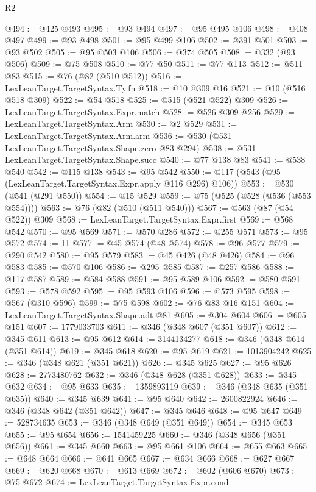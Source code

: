 \begin{lexlean}{R2}
\begin{coremodule}
@494 := @425 @493
@495 := @93 @494
@497 := @95 @495 @106
@498 := @408 @497
@499 := @93 @498
@501 := @95 @499 @106
@502 := @391 @501
@503 := @93 @502
@505 := @95 @503 @106
@506 := @374 @505
@508 := @332 (@93 @506)
@509 := @75 @508
@510 := @77 @50
@511 := @77 @113
@512 := @511 @83
@515 := @76 (@82 (@510 @512))
@516 := LexLeanTarget.TargetSyntax.Ty.fn
@518 := @10 @309 @16
@521 := @10 (@516 @518 @309)
@522 := @54 @518
@525 := @515 (@521 @522) @309
@526 := LexLeanTarget.TargetSyntax.Expr.match
@528 := @526 @309 @256
@529 := LexLeanTarget.TargetSyntax.Arm
@530 := @2 @529
@531 := LexLeanTarget.TargetSyntax.Arm.arm
@536 := @530 (@531 LexLeanTarget.TargetSyntax.Shape.zero @83 @294)
@538 := @531 LexLeanTarget.TargetSyntax.Shape.succ
@540 := @77 @138 @83
@541 := @538 @540
@542 := @115 @138
@543 := @95 @542
@550 := @117 (@543 (@95 (LexLeanTarget.TargetSyntax.Expr.apply @116 @296) @106))
@553 := @530 (@541 (@291 @550))
@554 := @15 @529
@559 := @75 (@525 (@528 (@536 (@553 @554))))
@563 := @76 (@82 (@510 (@511 @540)))
@567 := @563 (@87 (@54 @522)) @309
@568 := LexLeanTarget.TargetSyntax.Expr.first
@569 := @568 @542
@570 := @95 @569
@571 := @570 @286
@572 := @255 @571
@573 := @95 @572
@574 := 11
@577 := @45 @574 (@48 @574)
@578 := @96 @577
@579 := @290 @542
@580 := @95 @579
@583 := @45 @426 (@48 @426)
@584 := @96 @583
@585 := @570 @106
@586 := @295 @585
@587 := @257 @586
@588 := @117 @587
@589 := @584 @588
@591 := @95 @589 @106
@592 := @580 @591
@593 := @578 @592
@595 := @95 @593 @106
@596 := @573 @595
@598 := @567 (@310 @596)
@599 := @75 @598
@602 := @76 @83 @16 @151
@604 := LexLeanTarget.TargetSyntax.Shape.adt @81
@605 := @304 @604
@606 := @605 @151
@607 := 1779033703
@611 := @346 (@348 @607 (@351 @607))
@612 := @345 @611
@613 := @95 @612
@614 := 3144134277
@618 := @346 (@348 @614 (@351 @614))
@619 := @345 @618
@620 := @95 @619
@621 := 1013904242
@625 := @346 (@348 @621 (@351 @621))
@626 := @345 @625
@627 := @95 @626
@628 := 2773480762
@632 := @346 (@348 @628 (@351 @628))
@633 := @345 @632
@634 := @95 @633
@635 := 1359893119
@639 := @346 (@348 @635 (@351 @635))
@640 := @345 @639
@641 := @95 @640
@642 := 2600822924
@646 := @346 (@348 @642 (@351 @642))
@647 := @345 @646
@648 := @95 @647
@649 := 528734635
@653 := @346 (@348 @649 (@351 @649))
@654 := @345 @653
@655 := @95 @654
@656 := 1541459225
@660 := @346 (@348 @656 (@351 @656))
@661 := @345 @660
@663 := @95 @661 @106
@664 := @655 @663
@665 := @648 @664
@666 := @641 @665
@667 := @634 @666
@668 := @627 @667
@669 := @620 @668
@670 := @613 @669
@672 := @602 (@606 @670)
@673 := @75 @672
@674 := LexLeanTarget.TargetSyntax.Expr.cond

\end{coremodule}
\end{lexlean}
